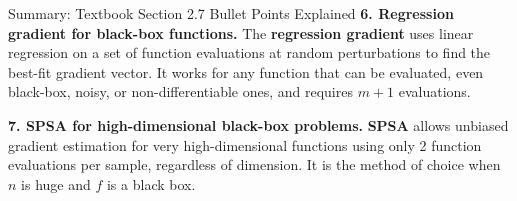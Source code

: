 \documentclass[aspectratio=169,10pt]{beamer}
\begin{document}
\begin{frame}[allowframebreaks]{Summary: Textbook Section 2.7 Bullet Points Explained}
  \medskip
  \textbf{6. Regression gradient for black-box functions.}
  The \textbf{regression gradient} uses linear regression on a set of
  function evaluations at random perturbations to find the best-fit
  gradient vector.  It works for any function that can be evaluated,
  even black-box, noisy, or non-differentiable ones, and requires $m+1$
  evaluations.

  \medskip
  \textbf{7. SPSA for high-dimensional black-box problems.}
  \textbf{SPSA} allows unbiased gradient estimation for very high-dimensional
  functions using only 2 function evaluations per sample, regardless of
  dimension.  It is the method of choice when $n$ is huge and $f$ is a
  black box.

\end{frame}

\end{document}

